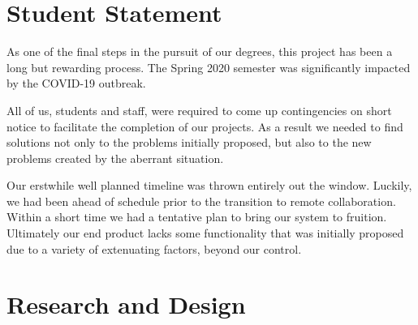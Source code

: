\documentclass[a4paper,11pt]{report}
\begin{document}
	\section{Student Statement}
	As one of the final steps in the pursuit of our degrees, this project has been a long but rewarding process. The Spring 2020 semester was significantly impacted by the COVID-19 outbreak. 
	\par All of us, students and staff, were required to come up contingencies on short notice to facilitate the completion of our projects. As a result we needed to find solutions not only to the problems initially proposed, but also to the new problems created by the aberrant situation. 
	\par Our erstwhile well planned timeline was thrown entirely out the window. Luckily, we had been ahead of schedule prior to the transition to remote collaboration. Within a short time we had a tentative plan to bring our system to fruition. Ultimately our end product lacks some functionality that was initially proposed due to a variety of extenuating factors, beyond our control. 
	\tableofcontents
	\section{Research and Design}
\end{document}
